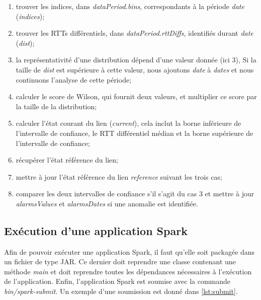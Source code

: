  \begin{enumerate}
 	\item trouver les indices,  dans \textit{dataPeriod.bins}, correspondants à la période \textit{date} (\textit{indices});
 	
 	\item trouver les RTTs différentiels, dans \textit{dataPeriod.rttDiffs}, identifiés durant  \textit{date} (\textit{dist});
 	
 	\item la représentativité d'une distribution dépend d'une valeur donnée  (ici $3$), Si la taille de \textit{dist} est supérieure à cette valeur, nous ajoutons \textit{date} à \textit{dates} et nous continuons l'analyse de cette période;
 	\item calculer le score de Wilson, qui fournit deux valeurs, et multiplier ce score par la taille de la distribution;
 	\item calculer l'état courant du lien (\textit{current}), cela inclut la borne inférieure de l'intervalle de confiance, le RTT différentiel médian et la borne supérieure de l'intervalle de confiance;
 	\item  récupérer l'état référence du lien;
 	\item mettre à jour l'état référence du lien \textit{reference} suivant les trois cas;
 	\item  comparer les deux intervalles de confiance s'il s'agit du cas $3$ et mettre à jour \textit{alarmsValues} et \textit{alarmsDates} si une anomalie est identifiée.
 	
 \end{enumerate}



\subsection{Exécution d'une application Spark} Afin de pouvoir exécuter une application Spark, il faut qu'elle soit packagée dans un fichier de type JAR. Ce dernier doit reprendre une classe contenant une méthode \textit{main} et doit reprendre toutes les dépendances nécessaires à l'exécution de l'application.  Enfin, l'application Spark  est soumise avec la commande \textit{bin/spark-submit}. Un exemple d'une soumission est donné dans \ref{lst:submit}.

